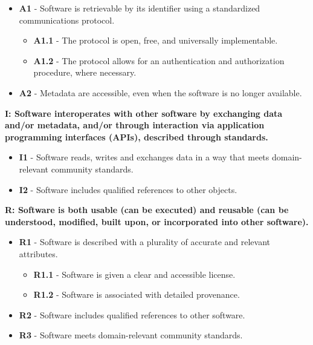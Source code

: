 \begin{itemize}
    \item \textbf{A1} - Software is retrievable by its identifier using a standardized communications protocol.

    \begin{itemize}
        \item \textbf{A1.1} - The protocol is open, free, and universally implementable.
        \item \textbf{A1.2} - The protocol allows for an authentication and authorization procedure, where necessary.
    \end{itemize}

    \item \textbf{A2} - Metadata are accessible, even when the software is no longer available.
\end{itemize}

\textbf{I: Software interoperates with other software by exchanging data and/or metadata, and/or
through interaction via application programming interfaces (APIs), described through
standards.}

\begin{itemize}
    \item \textbf{I1} - Software reads, writes and exchanges data in a way that meets domain-relevant community standards.
    \item \textbf{I2} - Software includes qualified references to other objects.
\end{itemize}

\textbf{R: Software is both usable (can be executed) and reusable (can be understood, modified, built
upon, or incorporated into other software).}

\begin{itemize}
    \item \textbf{R1} - Software is described with a plurality of accurate and relevant attributes.

    \begin{itemize}
        \item \textbf{R1.1} - Software is given a clear and accessible license.
        \item \textbf{R1.2} - Software is associated with detailed provenance.
    \end{itemize}

    \item \textbf{R2} - Software includes qualified references to other software.
    \item \textbf{R3} - Software meets domain-relevant community standards.
\end{itemize}

